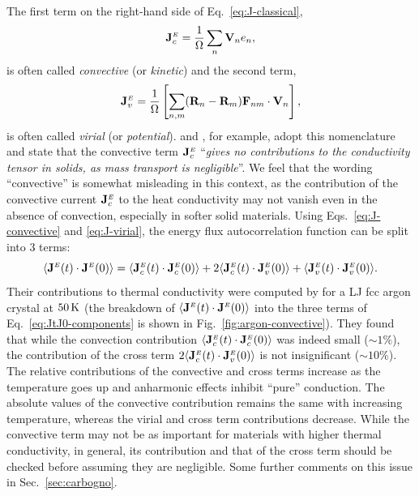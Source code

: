 \begin{LEtext}
The first term on the right-hand side of Eq.~\eqref{eq:J-classical},
\begin{equation}
    \mathbf{J}^\smallE_c = \frac{1}{\rOmega} \sum_n \mathbf{V}_n e_n , \label{eq:J-convective}
\end{equation}
is often called \emph{convective} (or \emph{kinetic}) and the second term,
\begin{equation}
    \mathbf{J}^\smallE_v = \frac{1}{\rOmega} \left[ \sum_{n,m} (\mathbf{R}_n-\mathbf{R}_m) \mathbf{F}_{n m} \cdot \mathbf{V}_n \right], \label{eq:J-virial}
\end{equation}
is often called \emph{virial} (or \emph{potential}).
\citet{Fan2015} and \citet{Carbogno:2017gc}, for example, adopt this nomenclature and state that the convective term $\mathbf{J}^{\scriptscriptstyle E}_c$ ``\emph{gives no contributions to the conductivity tensor in solids, as mass transport is negligible}''.
We feel that the wording ``convective'' is somewhat misleading in this context, as the contribution of the convective current $\mathbf{J}^{\scriptscriptstyle E}_c$ to the heat conductivity may not vanish even in the absence of convection, especially in softer solid materials. 
Using Eqs.~\eqref{eq:J-convective} and \eqref{eq:J-virial}, the energy flux autocorrelation function can be split into 3 terms:
\begin{equation}
    \langle\mathbf{J}^\smallE(t)\cdot\mathbf{J}^\smallE(0)\rangle = \langle\mathbf{J}_c^\smallE(t)\cdot\mathbf{J}_c^\smallE(0)\rangle + 
    2\langle\mathbf{J}_c^\smallE(t)\cdot\mathbf{J}_v^\smallE(0)\rangle + 
    \langle\mathbf{J}_v^\smallE(t)\cdot\mathbf{J}_v^\smallE(0)\rangle . \label{eq:JtJ0-components}
\end{equation}
Their contributions to thermal conductivity were computed by \citet{McGaughey2006} for a LJ fcc argon crystal at $50\,\mathrm{K}$ (the breakdown of $\langle\mathbf{J}^{\scriptscriptstyle E}(t)\cdot\mathbf{J}^{\scriptscriptstyle E}(0)\rangle$ into the three terms of Eq.~\eqref{eq:JtJ0-components} is shown in Fig.~\ref{fig:argon-convective}). They found that while the convection contribution $\langle\mathbf{J}_c^{\scriptscriptstyle E}(t)\cdot\mathbf{J}_c^{\scriptscriptstyle E}(0)\rangle$ was indeed small ($\sim 1\%$), the contribution of the cross term $2\langle\mathbf{J}_c^{\scriptscriptstyle E}(t)\cdot\mathbf{J}_v^{\scriptscriptstyle E}(0)\rangle$ is not insignificant ($\sim 10\%$). 
The relative contributions of the convective and cross terms increase as the temperature goes up and anharmonic effects inhibit ``pure'' conduction. 
The absolute values of the convective contribution remains the same with increasing temperature, whereas the virial and cross term contributions decrease. 
While the convective term may not be as important for materials with higher thermal conductivity, in general, its contribution and that of the cross term should be checked before assuming they are negligible. Some further comments on this issue in Sec.~\ref{sec:carbogno}. 


\end{LEtext}
